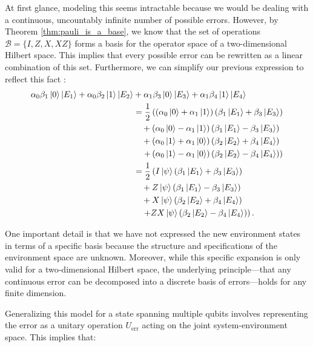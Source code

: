 At first glance, modeling this seems intractable because we would be dealing with a continuous, uncountably infinite number of possible errors. However, by Theorem \ref{thm:pauli_is_a_base}, we know that the set of operations $\mathcal{B} = \{I, Z, X, XZ\}$ forms a basis for the operator space of a two-dimensional Hilbert space. This implies that every possible error can be rewritten as a linear combination of this set. Furthermore, we can simplify our previous expression to reflect this fact \citep{Mosca2007}:
\begin{align*}
\alpha_0\beta_1 \ket{0}\ket{E_1} + \alpha_0\beta_2 \ket{1}\ket{E_2} &+ \alpha_1\beta_3 \ket{0}\ket{E_3} + \alpha_1\beta_4 \ket{1}\ket{E_4} \\
&= \frac{1}{2} \left( \left(\alpha_0 \ket{0} + \alpha_1 \ket{1}\right)\left(\beta_1 \ket{E_1} + \beta_3 \ket{E_3}\right) \right. \\
&\quad + \left(\alpha_0 \ket{0} - \alpha_1 \ket{1}\right)\left(\beta_1 \ket{E_1} - \beta_3 \ket{E_3}\right) \\
&\quad + \left(\alpha_0 \ket{1} + \alpha_1 \ket{0}\right)\left(\beta_2 \ket{E_2} + \beta_4 \ket{E_4}\right) \\
&\quad \left. + \left(\alpha_0 \ket{1} - \alpha_1 \ket{0}\right)\left(\beta_2 \ket{E_2} - \beta_4 \ket{E_4}\right) \right) \\
&= \frac{1}{2} \left( I\ket{\psi}\left(\beta_1 \ket{E_1} + \beta_3 \ket{E_3}\right) \right. \\
&\quad + Z\ket{\psi}\left(\beta_1 \ket{E_1} - \beta_3 \ket{E_3}\right) \\
&\quad + X\ket{\psi}\left(\beta_2 \ket{E_2} + \beta_4 \ket{E_4}\right) \\
&\quad \left. + ZX\ket{\psi}\left(\beta_2 \ket{E_2} - \beta_4 \ket{E_4}\right) \right)
.\end{align*}

One important detail is that we have not expressed the new environment states in terms of a specific basis because the structure and specifications of the environment space are unknown. Moreover, while this specific expansion is only valid for a two-dimensional Hilbert space, the underlying principle---that any continuous error can be decomposed into a discrete basis of errors---holds for any finite dimension.

Generalizing this model for a state spanning multiple qubits involves representing the error as a unitary operation $U_{\text{err}}$ acting on the joint system-environment space. This implies that:

